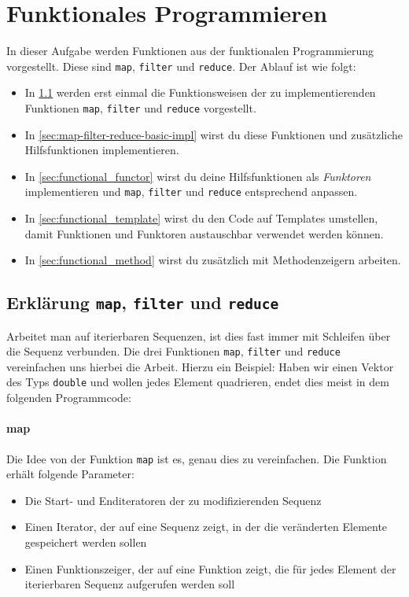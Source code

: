 \section{\ExercisePrefixAdvanced Funktionales Programmieren} %
\label{sec:functional}

In dieser Aufgabe werden Funktionen aus der funktionalen Programmierung vorgestellt.
Diese sind \lstinline{map}, \lstinline{filter} und \lstinline{reduce}.
%
Der Ablauf ist wie folgt:
\begin{itemize}
\item
In \ref{sec:map-filter-reduce-intro} werden erst einmal die Funktionsweisen der zu implementierenden Funktionen \lstinline{map}, \lstinline{filter} und \lstinline{reduce} vorgestellt.
\item
In \ref{sec:map-filter-reduce-basic-impl} wirst du diese Funktionen und zusätzliche Hilfsfunktionen implementieren.
\item
In \ref{sec:functional_functor} wirst du deine Hilfsfunktionen als \emph{Funktoren} implementieren und \lstinline{map}, \lstinline{filter} und \lstinline{reduce} entsprechend anpassen.
\item
In \ref{sec:functional_template} wirst du den Code auf Templates umstellen, damit Funktionen und Funktoren austauschbar verwendet werden können.
\item
In \ref{sec:functional_method} wirst du zusätzlich mit Methodenzeigern arbeiten.
\end{itemize}

\subsection{Erklärung \lstinline{map}, \lstinline{filter} und \lstinline{reduce}}
\label{sec:map-filter-reduce-intro}

Arbeitet man auf iterierbaren Sequenzen, ist dies fast immer mit Schleifen über die Sequenz verbunden.
Die drei Funktionen \lstinline{map}, \lstinline{filter} und \lstinline{reduce} vereinfachen uns hierbei die Arbeit.
Hierzu ein Beispiel:
Haben wir einen Vektor des Typs \lstinline{double} und wollen jedes Element quadrieren, endet dies meist in dem folgenden Programmcode:


\paragraph{map}
Die Idee von der Funktion \lstinline{map} ist es, genau dies zu vereinfachen.
Die Funktion erhält folgende Parameter: 
\begin{itemize}
\item
Die Start- und Enditeratoren der zu modifizierenden Sequenz
\item
Einen Iterator, der auf eine Sequenz zeigt, in der die veränderten Elemente gespeichert werden sollen
\item
Einen Funktionszeiger, der auf eine Funktion zeigt, die für jedes Element der iterierbaren Sequenz aufgerufen werden soll
\end{itemize}


